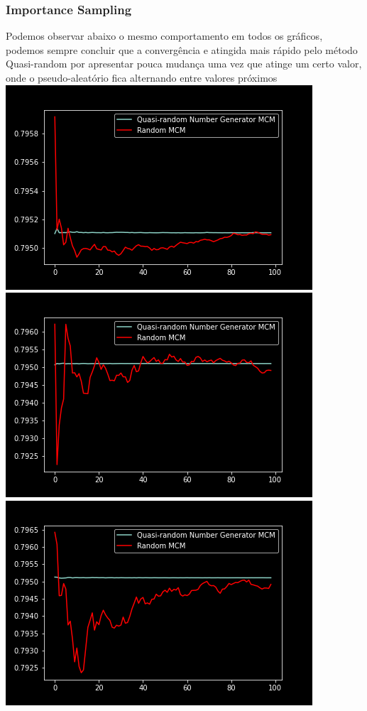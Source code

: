 \documentclass[twocolumn,amsmath,amssymb,floatfix]{revtex4}
\begin{document}
\subsubsection{Importance Sampling}
\indent Podemos observar abaixo o mesmo comportamento em todos os gráficos, podemos sempre concluir que a convergência e atingida mais rápido pelo método Quasi-random por apresentar pouca mudança uma vez que atinge um certo valor, onde o pseudo-aleatório fica alternando entre valores próximos
\includegraphics[scale=0.55]{BetaImportanceSamplingComparison.png}
\includegraphics[scale=0.55]{GammaImportanceSamplingComparison.png}
\includegraphics[scale=0.55]{WeibullImportanceSamplingComparison.png}
\end{document}
